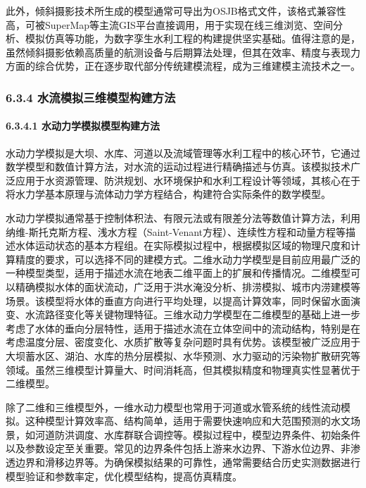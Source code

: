 此外，倾斜摄影技术所生成的模型通常可导出为OSJB格式文件，该格式兼容性高，可被SuperMap等主流GIS平台直接调用，用于实现在线三维浏览、空间分析、模拟仿真等功能，为数字孪生水利工程的构建提供坚实基础。值得注意的是，虽然倾斜摄影依赖高质量的航测设备与后期算法处理，但其在效率、精度与表现力方面的综合优势，正在逐步取代部分传统建模流程，成为三维建模主流技术之一。

\subsubsection{6.3.4 水流模拟三维模型构建方法}\label{ux6c34ux6d41ux6a21ux62dfux4e09ux7ef4ux6a21ux578bux6784ux5efaux65b9ux6cd5}

\paragraph{6.3.4.1 水动力学模拟模型构建方法}\label{ux6c34ux52a8ux529bux5b66ux6a21ux62dfux6a21ux578bux6784ux5efaux65b9ux6cd5}

水动力学模拟是大坝、水库、河道以及流域管理等水利工程中的核心环节，它通过数学模型和数值计算方法，对水流的运动过程进行精确描述与仿真。该模拟技术广泛应用于水资源管理、防洪规划、水环境保护和水利工程设计等领域，其核心在于将水力学基本原理与流体动力学方程结合，构建符合实际条件的数学模型。

水动力学模拟通常基于控制体积法、有限元法或有限差分法等数值计算方法，利用纳维-斯托克斯方程、浅水方程（Saint-Venant方程）、连续性方程和动量方程等描述水体运动状态的基本方程组。在实际模拟过程中，根据模拟区域的物理尺度和计算精度的要求，可以选择不同的建模方式。二维水动力学模型是目前应用最广泛的一种模型类型，适用于描述水流在地表二维平面上的扩展和传播情况。二维模型可以精确模拟水体的面状流动，广泛用于洪水淹没分析、排涝模拟、城市内涝建模等场景。该模型将水体的垂直方向进行平均处理，以提高计算效率，同时保留水面演变、水流路径变化等关键物理特征。三维水动力学模型在二维模型的基础上进一步考虑了水体的垂向分层特性，适用于描述水流在立体空间中的流动结构，特别是在考虑温度分层、密度变化、水质扩散等复杂问题时具有优势。该模型被广泛应用于大坝蓄水区、湖泊、水库的热分层模拟、水华预测、水力驱动的污染物扩散研究等领域。虽然三维模型计算量大、时间消耗高，但其模拟精度和物理真实性显著优于二维模型。

除了二维和三维模型外，一维水动力模型也常用于河道或水管系统的线性流动模拟。这种模型计算效率高、结构简单，适用于需要快速响应和大范围预测的水文场景，如河道防洪调度、水库群联合调控等。模拟过程中，模型边界条件、初始条件以及参数设定至关重要。常见的边界条件包括上游来水边界、下游水位边界、非渗透边界和滑移边界等。为确保模拟结果的可靠性，通常需要结合历史实测数据进行模型验证和参数率定，优化模型结构，提高仿真精度。

